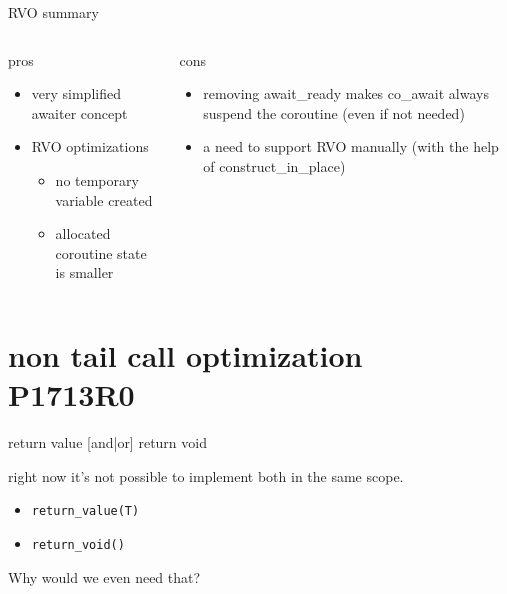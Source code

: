 \documentclass[10pt]{beamer}
\begin{document}
\begin{frame}{RVO summary}
\begin{columns}[T]

\begin{column}{0.48\linewidth}
\centerline{pros}
\begin{itemize}[<+-| alert@+>]
	\item very simplified awaiter concept
	\item RVO optimizations
	\begin{itemize}
		\item no temporary variable created
		\item allocated coroutine state is smaller
	\end{itemize}
\end{itemize}
\end{column}
\begin{column}{0.48\linewidth}
\centerline{cons}
\begin{itemize}[<+-| alert@+>]
	\item removing \alert{await\_ready} makes \alert{co\_await} always suspend the coroutine (even if not needed)
	\item a need to support RVO manually (with the help of \alert{construct\_in\_place})
\end{itemize}
\end{column}
\end{columns}

\end{frame}

\section{non tail call optimization \\ P1713R0}

\begin{frame}{return value [and|or] return void}

\vfill

right now it's not possible to implement both in the same scope.

\begin{itemize}
	\item \texttt{return\_value(T)}
	\item \texttt{return\_void()}
\end{itemize}

\pause

\centerline{\alert{Why would we even need that?}}

\end{frame}
\end{document}
